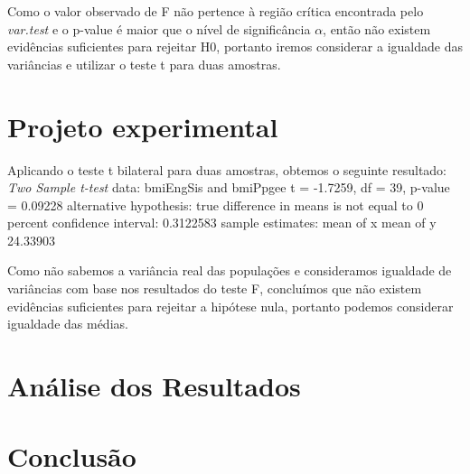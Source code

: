 \documentclass[12pt, a4paper]{article}
\begin{document}
\par Como o valor observado de F não pertence à região crítica encontrada pelo \textit{var.test} e o p-value é maior que o nível de significância $\alpha$, então não existem evidências suficientes para rejeitar H0, portanto iremos considerar a igualdade das variâncias e utilizar o teste t para duas amostras.

\section{Projeto experimental}
\label{sec:projeto-experimental}
Aplicando o teste t bilateral para duas amostras, obtemos o seguinte resultado:
\newline
\newline
\textit{Two Sample t-test} \newline
data:  bmiEngSis and bmiPpgee \newline
t = -1.7259, df = 39, p-value = 0.09228 \newline
alternative hypothesis: true difference in means is not equal to 0  percent confidence interval:   0.3122583 \newline
sample estimates: \newline
mean of x mean of y   24.33903 \newline

\par Como não sabemos a variância real das populações e consideramos igualdade de variâncias com base nos resultados do teste F, concluímos que não existem evidências suficientes para rejeitar a hipótese nula, portanto podemos considerar igualdade das médias.

\section{Análise dos Resultados}

\section{Conclusão}

\begin{thebibliography}{7}
\end{thebibliography}		
		
\end{document}
